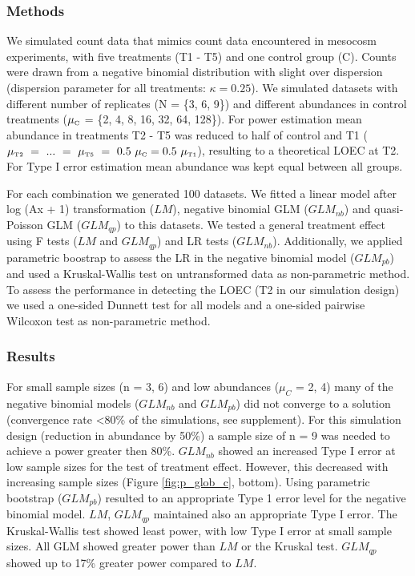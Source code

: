 \documentclass{scrartcl}
\begin{document}
\subsubsection{Methods}
We simulated count data that mimics count data encountered in mesocosm experiments, with five treatments (T1 - T5) and one control group (C).
Counts were drawn from a negative binomial distribution with slight over dispersion (dispersion parameter for all treatments: $\kappa = 0.25$).
We simulated datasets with different number of replicates (N = \{3, 6, 9\}) and different abundances in control treatments ($\mu_\text{\tiny C}$ = \{2, 4, 8, 16, 32, 64, 128\}). 
For power estimation mean abundance in treatments T2 - T5 was reduced to half of control and T1 ($\mu_\text{\tiny T2}~=~...~=~\mu_\text{\tiny T5}~=~0.5~\mu_\text{\tiny C} = 0.5~\mu_\text{\tiny T1}$), resulting to a theoretical LOEC at T2.
For Type I error estimation mean abundance was kept equal between all groups.

For each combination we generated 100 datasets. 
We fitted a linear model after log (Ax + 1) transformation ($LM$), negative binomial GLM ($GLM_{nb}$) and quasi-Poisson GLM ($GLM_{qp}$) to this datasets. 
We tested a general treatment effect using F tests ($LM$ and $GLM_{qp}$) and LR tests ($GLM_{nb}$). Additionally, we applied parametric boostrap to assess the LR in the negative binomial model ($GLM_{pb}$) and used a Kruskal-Wallis test on untransformed data as non-parametric method.
To assess the performance in detecting the LOEC (T2 in our simulation design) we used a one-sided Dunnett test for all models and a one-sided pairwise Wilcoxon test as non-parametric method.
 

\subsubsection{Results}
For small sample sizes (n = {3, 6}) and low abundances ($\mu_C$ = {2, 4}) many of the negative binomial models ($GLM_{nb}$ and $GLM_{pb}$) did not converge to a solution (convergence rate \textless 80\% of the simulations, see supplement).  
For this simulation design (reduction in abundance by 50\%) a sample size of n = 9 was needed to achieve a power greater then 80\%.
$GLM_{nb}$ showed an increased Type I error at low sample sizes for the test of treatment effect. 
However, this decreased with increasing sample sizes (Figure \ref{fig:p_glob_c}, bottom).
Using parametric bootstrap ($GLM_{pb}$) resulted to an appropriate Type 1 error level for the negative binomial model.
$LM$, $GLM_{qp}$ maintained also an appropriate Type I error.
The Kruskal-Wallis test showed least power, with low Type I error at small sample sizes. 
All GLM showed greater power than $LM$ or the Kruskal test. 
$GLM_{qp}$ showed up to 17\% greater power compared to $LM$.
\end{document}
